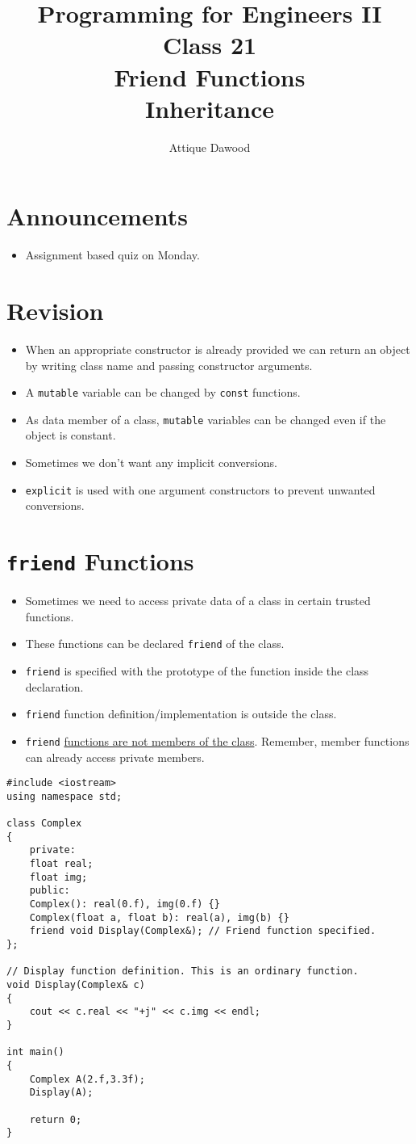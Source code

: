 \documentclass[12pt,a4paper]{article}
\title{\vspace{-2cm}Programming for Engineers II\\Class 21\\Friend Functions\\Inheritance}
\author{Attique Dawood}
\begin{document}
\maketitle
\section{Announcements}
\begin{itemize}
\item Assignment based quiz on Monday.
\end{itemize}
\section{Revision}
\begin{itemize}
\item When an appropriate constructor is already provided we can return an object by writing class name and passing constructor arguments.
\item A \texttt{mutable} variable can be changed by \texttt{const} functions.
\item As data member of a class, \verb|mutable| variables can be changed even if the object is constant.
\item Sometimes we don't want any implicit conversions.
\item \verb|explicit| is used with one argument constructors to prevent unwanted conversions.
\end{itemize}
\section{\texttt{friend} Functions}
\begin{itemize}
\item Sometimes we need to access private data of a class in certain trusted functions.
\item These functions can be declared \verb|friend| of the class.
\item \verb|friend| is specified with the prototype of the function inside the class declaration.
\item \verb|friend| function definition/implementation is outside the class.
\item \verb|friend| \underline{functions are not members of the class}. Remember, member functions can already access private members.
\end{itemize}
\begin{lstlisting}[caption={\texttt{friend} function to display Complex number}]
#include <iostream>
using namespace std;

class Complex
{
	private:
	float real;
	float img;
	public:
	Complex(): real(0.f), img(0.f) {}
	Complex(float a, float b): real(a), img(b) {}
	friend void Display(Complex&); // Friend function specified.
};

// Display function definition. This is an ordinary function.
void Display(Complex& c)
{
	cout << c.real << "+j" << c.img << endl;
}

int main()
{
	Complex A(2.f,3.3f);
	Display(A);

	return 0;
}
\end{lstlisting}
\end{document}
